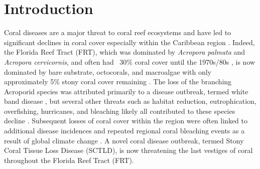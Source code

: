 \documentclass[utf8]{frontiersSCNS}
\begin{document}
\section{Introduction}

Coral diseases are a major threat to coral reef ecosystems and have led to significant declines in coral cover especially within the Caribbean region  \citep{richardson1998florida, sutherland2004disease, aronson2001white, harvell2007coral, miller2009coral, brandt2009dynamics}. Indeed, the Florida Reef Tract (FRT), which was dominated by \textit{Acropora palmata} and \textit{Acropora cervicornis}, and often had ~30\% coral cover until the 1970s/80s \citep{dustan1987changes, porter1992quantification}, is now dominated by bare substrate, octocorals, and macroalgae with only approximately 5\% stony coral cover remaining \citep{ruzicka2013temporal}. The loss of the branching Acroporid species was attributed primarily to a disease outbreak, termed white band disease \citep{aronson2001white}, but several other threats such as habitat reduction, eutrophication, overfishing, hurricanes, and bleaching likely all contributed to these species decline \citep{acropora2005atlantic}. Subsequent losses of coral cover within the region were often linked to additional disease incidences and repeated regional coral bleaching events as a result of global climate change \citep{kuta1996abundance, richardson1998florida, sutherland2004disease, gardner2003long, aronson2006conservation, kuffner2015century, manzello2015rapid}. A novel coral disease outbreak, termed Stony Coral Tissue Loss Disease (SCTLD), is now threatening the last vestiges of coral throughout the Florida Reef Tract (FRT).
\end{document}
